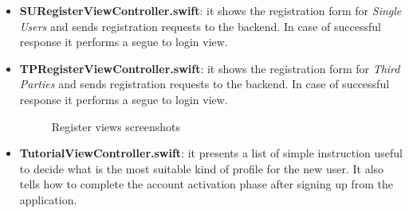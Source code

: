 \documentclass[titlepage]{article}
\begin{document}
\begin{itemize}
		\item {\bf SURegisterViewController.swift}: it shows the registration form for {\it Single Users} and sends registration requests to the backend. In case of successful response it performs a segue to login view.
		\item {\bf TPRegisterViewController.swift}: it shows the registration form for {\it Third Parties} and sends registration requests to the backend. In case of successful response it performs a segue to login view.
		\begin{figure}[H]%
			\centering
			\qquad
			\caption{Register views screenshots}%
			\label{fig:RequestTab}%
		\end{figure}
		\item {\bf TutorialViewController.swift}: it presents a list of simple instruction useful to decide what is the most suitable kind of profile for the new user. It also tells how to complete the account activation phase after signing up from the application.
		

\end{itemize}
\end{document}

